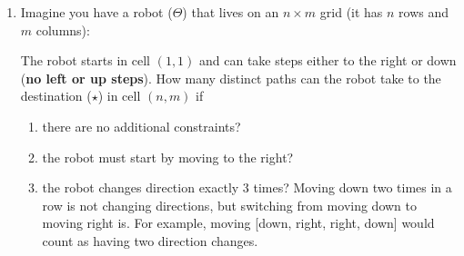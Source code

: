 \documentclass[12pt]{article}
\renewcommand{\(}{\left(}
\renewcommand{\)}{\right)}
\theoremstyle{definition}
\newtheorem*{answer}{Answer}
\begin{document}
\begin{enumerate}
\begin{enumerate}[label=\alph*.]
    \item a flush?  (A hand is said to be a flush if all 5 cards are of the same suit.  Note that this definition means that \emph{straight flushes} (five cards of the same suit in numeric sequence) are also considered flushes.)
    \item two pairs?  (This occurs when the cards have numeric values $a, a, b, b, c$, where $a$, $b$ and $c$ are all distinct.)
    \item four of a kind?  (This occurs when the cards have numeric values $a, a, a, a, b$, where $a$ and $b$ are distinct.)

    \end{enumerate}

    \begin{shaded}
    \begin{answer}

    \end{answer}
    \end{shaded}
    \newpage


\item Imagine you have a robot ($\Theta$) that lives on an $n \times m$ grid (it has $n$ rows and $m$ columns):
%
\begin{center}
\end{center}
%
The robot starts in cell $(1, 1)$ and can take steps either to the right or down (\textbf{no left or up
steps}). How many distinct paths can the robot take to the destination ($\star$) in cell $(n, m)$ if
    \begin{enumerate}[label=\alph*.]

    \item there are no additional constraints?
    \item the robot must start by moving to the right?
    \item the robot changes direction exactly 3 times? Moving down two times in a
row is not changing directions, but switching from moving down to moving right is. 
For example, moving [down, right, right, down] would count as having two direction changes.


\end{enumerate}
\end{enumerate}
\end{document}
